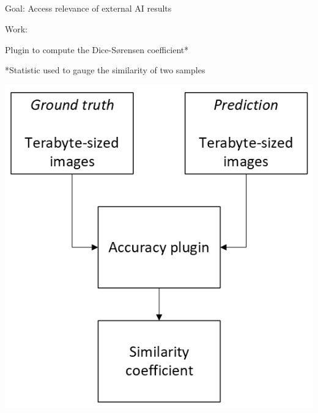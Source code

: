 \subsection{\slidetitle}
\begin{frame}
  \frametitle{\sectiontitle}
  \framesubtitle{\slidetitle}

  \begin{minipage}[h!]{0.65\textwidth}
    Goal: Access relevance of external AI results

    \bigskip

    Work:

    Plugin to compute the Dice-Sørensen coefficient*

    \bigskip
    \bigskip

    *Statistic used to gauge the similarity of two samples
  \end{minipage}\hfill
  \begin{minipage}[h!]{0.35\textwidth}
    \includegraphics[scale=0.55]{./img/4_accuracy.png}
  \end{minipage}
\end{frame}

\def\slidetitle{Benchmark example}

